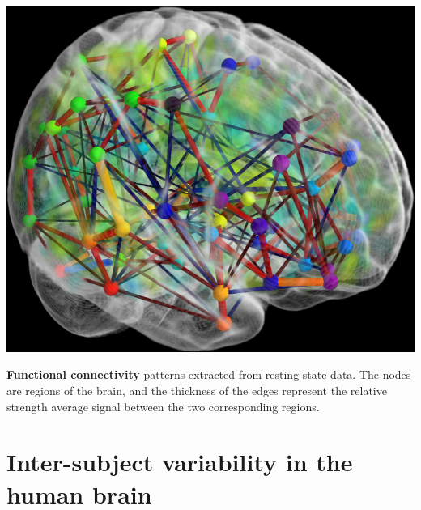 \begin{marginfigure}%
  \includegraphics[width=1\linewidth]{figures/connectome.png}
  \caption{\textbf{Functional connectivity} patterns extracted from resting state data. The nodes are regions of the brain, and the thickness
  of the edges represent the relative strength average signal between the two corresponding regions.}
\end{marginfigure}


\section{Inter-subject variability in the human brain}
